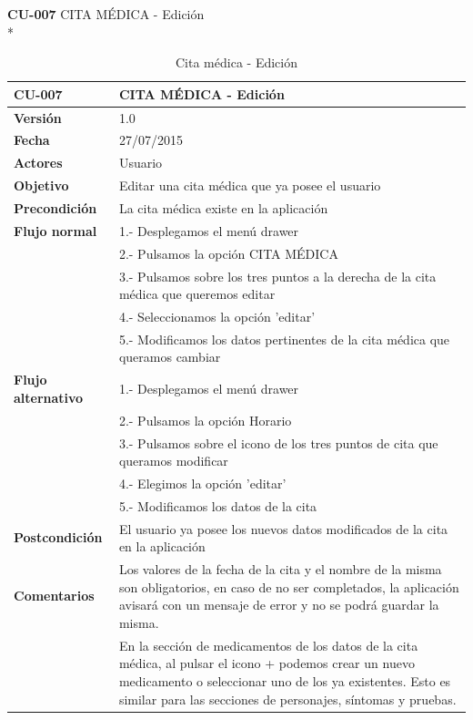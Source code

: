 \documentclass[../pfc.tex]{subfiles}
\begin{document}
	\clearpage	
		
	\textbf{CU-007}	CITA MÉDICA - Edición\\*
	
		\begin{table}[H]
			\centering
			\begin{tabular}[t]{|p{3cm}|p{9.5cm}|}
				\hline \textbf{CU-007} & \textbf{CITA MÉDICA - Edición} \\*
				\hline\hline \textbf{Versión} & 1.0 \\*
				\hline\hline \textbf{Fecha} & 27/07/2015 \\*
				\hline\textbf{Actores} 	& Usuario\\*
				\hline \textbf{Objetivo} & Editar una cita médica que ya posee el usuario\\* 			
				\hline \textbf{Precondición} & La cita médica existe en la aplicación\\* 
				\hline \textbf{Flujo normal} & 1.- Desplegamos el menú drawer \\* 
				& 2.- Pulsamos la opción CITA MÉDICA\\*	
				& 3.- Pulsamos sobre los tres puntos a la derecha de la cita médica que queremos editar\\*	
				& 4.- Seleccionamos la opción 'editar'\\*	
				& 5.- Modificamos los datos pertinentes de la cita médica que queramos cambiar\\*	
				\hline \textbf{Flujo alternativo} & 1.- Desplegamos el menú drawer \\* 
				& 2.- Pulsamos la opción Horario \\*	
				& 3.- Pulsamos sobre el icono de los tres puntos de cita que queramos modificar \\*	
				& 4.- Elegimos la opción 'editar'\\*	
				& 5.- Modificamos los datos de la cita\\*	
				\hline \textbf{Postcondición} & El usuario ya posee los nuevos datos modificados de la cita en la aplicación \\* 
				\hline \textbf{Comentarios}   & Los valores de la fecha de la cita y el nombre de la misma son obligatorios, en caso de no ser completados, la aplicación avisará con un mensaje de error y no se podrá guardar la misma.\\*
				& En la sección de medicamentos de los datos de la cita médica, al pulsar el icono + podemos crear un nuevo medicamento o seleccionar uno de los ya existentes. Esto es similar para las secciones de personajes, síntomas y pruebas.\\*
				\hline
			\end{tabular}
			\caption{Cita médica - Edición}
			\label{tabla:caso007}
		\end{table}
		
\end{document}
